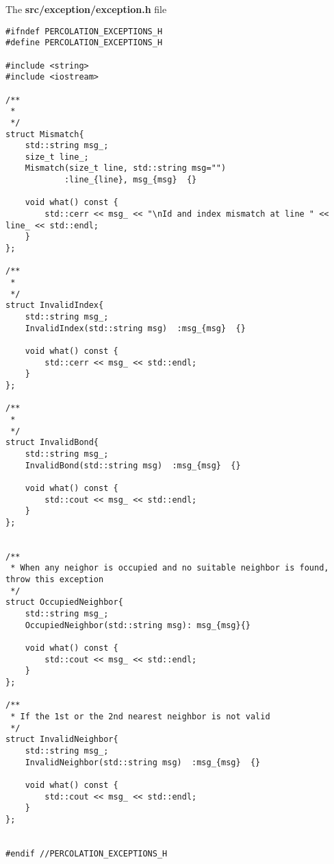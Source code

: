 
The \textbf{src/exception/exception.h} file

\begin{lstlisting}[style=CStyle]
#ifndef PERCOLATION_EXCEPTIONS_H
#define PERCOLATION_EXCEPTIONS_H

#include <string>
#include <iostream>

/**
 *
 */
struct Mismatch{
    std::string msg_;
    size_t line_;
    Mismatch(size_t line, std::string msg="")
            :line_{line}, msg_{msg}  {}

    void what() const {
        std::cerr << msg_ << "\nId and index mismatch at line " << line_ << std::endl;
    }
};

/**
 *
 */
struct InvalidIndex{
    std::string msg_;
    InvalidIndex(std::string msg)  :msg_{msg}  {}

    void what() const {
        std::cerr << msg_ << std::endl;
    }
};

/**
 *
 */
struct InvalidBond{
    std::string msg_;
    InvalidBond(std::string msg)  :msg_{msg}  {}

    void what() const {
        std::cout << msg_ << std::endl;
    }
};


/**
 * When any neighor is occupied and no suitable neighbor is found, throw this exception
 */
struct OccupiedNeighbor{
    std::string msg_;
    OccupiedNeighbor(std::string msg): msg_{msg}{}

    void what() const {
        std::cout << msg_ << std::endl;
    }
};

/**
 * If the 1st or the 2nd nearest neighbor is not valid
 */
struct InvalidNeighbor{
    std::string msg_;
    InvalidNeighbor(std::string msg)  :msg_{msg}  {}

    void what() const {
        std::cout << msg_ << std::endl;
    }
};


#endif //PERCOLATION_EXCEPTIONS_H
\end{lstlisting}


